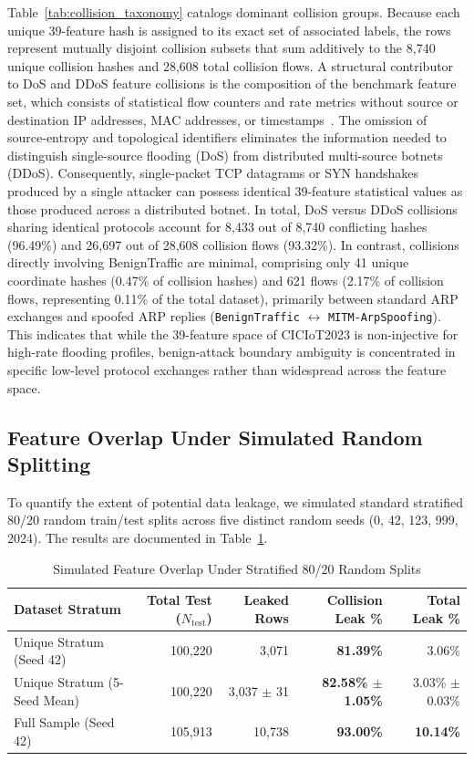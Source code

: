 \documentclass[conference,10pt,twocolumn]{IEEEtran}
\begin{document}
Table~\ref{tab:collision_taxonomy} catalogs dominant collision groups. Because each unique 39-feature hash is assigned to its exact set of associated labels, the rows represent mutually disjoint collision subsets that sum additively to the 8,740 unique collision hashes and 28,608 total collision flows. A structural contributor to DoS and DDoS feature collisions is the composition of the benchmark feature set, which consists of statistical flow counters and rate metrics without source or destination IP addresses, MAC addresses, or timestamps~\cite{neto2023ciciot}. The omission of source-entropy and topological identifiers eliminates the information needed to distinguish single-source flooding (DoS) from distributed multi-source botnets (DDoS). Consequently, single-packet TCP datagrams or SYN handshakes produced by a single attacker can possess identical 39-feature statistical values as those produced across a distributed botnet. In total, DoS versus DDoS collisions sharing identical protocols account for 8,433 out of 8,740 conflicting hashes (96.49\%) and 26,697 out of 28,608 collision flows (93.32\%). In contrast, collisions directly involving BenignTraffic are minimal, comprising only 41 unique coordinate hashes (0.47\% of collision hashes) and 621 flows (2.17\% of collision flows, representing 0.11\% of the total dataset), primarily between standard ARP exchanges and spoofed ARP replies (\texttt{BenignTraffic} $\leftrightarrow$ \texttt{MITM-ArpSpoofing}). This indicates that while the 39-feature space of CICIoT2023 is non-injective for high-rate flooding profiles, benign-attack boundary ambiguity is concentrated in specific low-level protocol exchanges rather than widespread across the feature space.

\subsection{Feature Overlap Under Simulated Random Splitting}
To quantify the extent of potential data leakage, we simulated standard stratified 80/20 random train/test splits across five distinct random seeds (0, 42, 123, 999, 2024). The results are documented in Table~\ref{tab:leakage_simulation}.

\begin{table}[h]
\centering
\caption{Simulated Feature Overlap Under Stratified 80/20 Random Splits}
\label{tab:leakage_simulation}
\small
\begin{tabular}{@{}lrrrr@{}}
\toprule
\textbf{Dataset Stratum} & \textbf{Total Test ($N_{\text{test}}$)} & \textbf{Leaked Rows} & \textbf{Collision Leak \%} & \textbf{Total Leak \%} \\ \midrule
Unique Stratum (Seed 42) & 100,220 & 3,071 & \textbf{81.39\%} & 3.06\% \\
Unique Stratum (5-Seed Mean) & 100,220 & 3,037 $\pm$ 31 & \textbf{82.58\% $\pm$ 1.05\%} & 3.03\% $\pm$ 0.03\% \\ \midrule
Full Sample (Seed 42) & 105,913 & 10,738 & \textbf{93.00\%} & \textbf{10.14\%} \\
\bottomrule
\end{tabular}
\end{table}
\end{document}

